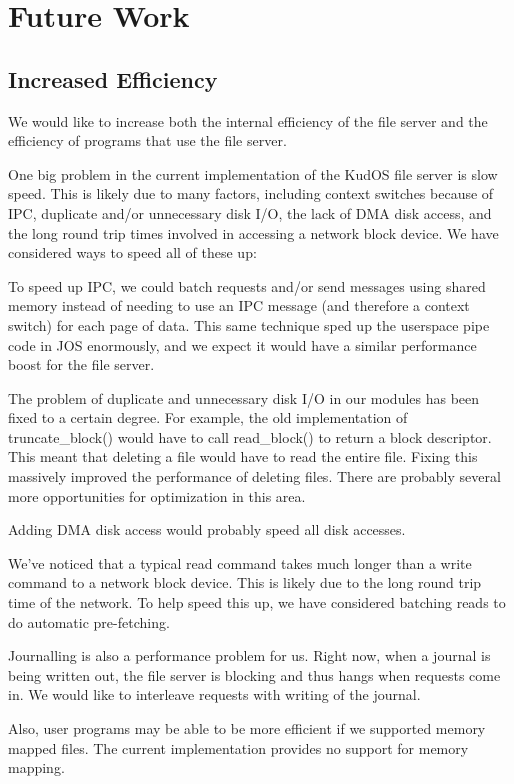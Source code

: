\section{Future Work}
\label{sec:future}

\subsection{Increased Efficiency}

We would like to increase both the internal efficiency of the file server and
the efficiency of programs that use the file server.

One big problem in the current implementation of the KudOS file server is slow
speed. This is likely due to many factors, including context switches because of
IPC, duplicate and/or unnecessary disk I/O, the lack of DMA disk access, and the
long round trip times involved in accessing a network block device. We have
considered ways to speed all of these up:

To speed up IPC, we could batch requests and/or send messages using shared
memory instead of needing to use an IPC message (and therefore a context switch)
for each page of data. This same technique sped up the userspace pipe code in
JOS enormously, and we expect it would have a similar performance boost for the
file server.

The problem of duplicate and unnecessary disk I/O in our modules has been fixed
to a certain degree. For example, the old implementation of truncate\_block()
would have to call read\_block() to return a block descriptor. This meant that
deleting a file would have to read the entire file. Fixing this massively
improved the performance of deleting files. There are probably several more
opportunities for optimization in this area.

Adding DMA disk access would probably speed all disk accesses.

We've noticed that a typical read command takes much longer than a write command
to a network block device. This is likely due to the long round trip time of the
network. To help speed this up, we have considered batching reads to do
automatic pre-fetching.

Journalling is also a performance problem for us. Right now, when a journal is
being written out, the file server is blocking and thus hangs when requests come
in. We would like to interleave requests with writing of the journal.

Also, user programs may be able to be more efficient if we supported memory
mapped files. The current implementation provides no support for memory mapping.

